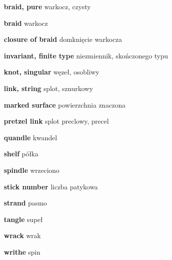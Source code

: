 \item \textbf{braid, pure} warkocz, czysty
\item \textbf{braid} warkocz
\item \textbf{closure of braid} domknięcie warkocza
\item \textbf{invariant, finite type} niezmiennik, skończonego typu
\item \textbf{knot, singular} węzeł, osobliwy
\item \textbf{link, string} splot, sznurkowy
\item \textbf{marked surface} powierzchnia znaczona
\item \textbf{pretzel link} splot preclowy, precel
\item \textbf{quandle} kwandel
\item \textbf{shelf} półka
\item \textbf{spindle} wrzeciono
\item \textbf{stick number} liczba patykowa
\item \textbf{strand} pasmo
\item \textbf{tangle} supeł
\item \textbf{wrack} wrak
\item \textbf{writhe} spin

